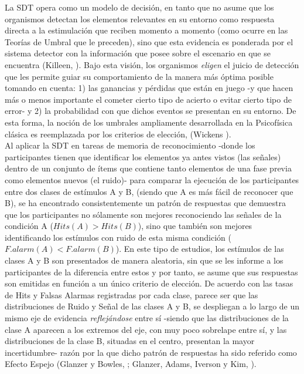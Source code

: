 La SDT opera como un modelo de decisión, en tanto que no asume que los organismos detectan los elementos relevantes en su entorno como respuesta directa a la estimulación que reciben momento a momento (como ocurre en las Teorías de Umbral que le preceden), sino que esta evidencia es ponderada por el sistema detector con la información que posee sobre el escenario en que se encuentra (Killeen, \citeyear{Killeen2014}). Bajo esta visión, los organismos \textit{eligen} el juicio de detección que les permite guiar su comportamiento de la manera más óptima posible tomando en cuenta: 1) las ganancias y pérdidas que están en juego -y que hacen más o menos importante el cometer cierto tipo de acierto o evitar cierto tipo de error- y 2) la probabilidad con que dichos eventos se presentan en su entorno. De esta forma, la noción de los umbrales ampliamente desarrollada en la Psicofísica clásica es reemplazada por los criterios de elección, (Wickens \citeyear{Wickens1}).\\ 

Al aplicar la SDT en tareas de memoria de reconocimiento -donde los participantes tienen que identificar los elementos ya antes vistos (las señales) dentro de un conjunto de ítems que contiene tanto elementos de una fase previa como elementos nuevos (el ruido)- para comparar la ejecución de los participantes entre dos clases de estímulos A y B, (siendo que A es más fácil de reconocer que B), se ha encontrado consistentemente un patrón de respuestas que demuestra que los participantes no sólamente son mejores reconociendo las señales de la condición A ($Hits(A)>Hits(B)$), sino que también son mejores identificando los estímulos con ruido de esta misma condición ($F.alarm(A)<F.alarm(B)$). En este tipo de estudios, los estímulos de las clases A y B son presentados de manera aleatoria, sin que se les informe a los participantes de la diferencia entre estos y por tanto, se asume que sus respuestas son emitidas en función a un único criterio de elección. De acuerdo con las tasas de Hits y Falsas Alarmas registradas por cada clase, parece ser que las distribuciones de Ruido y Señal de las clases A y B, se despliegan a lo largo de un mismo eje de evidencia \textit{reflejándose} entre sí -siendo que las distribuciones de la clase A aparecen a los extremos del eje, con muy poco sobrelape entre sí, y las distribuciones de la clase B, situadas en el centro, presentan la mayor incertidumbre- razón por la que dicho patrón de respuestas ha sido referido como Efecto Espejo (Glanzer y Bowles, \citeyear{Glanzer1976}; Glanzer, Adams, Iverson y Kim, \citeyear{Glanzer1993}).\\

